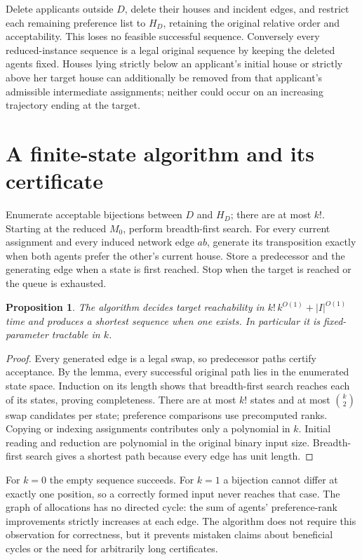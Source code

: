 \documentclass[11pt]{article}
\newtheorem{proposition}{Proposition}
\begin{document}
Delete applicants outside $D$, delete their houses and incident edges, and restrict each remaining preference list to $H_D$, retaining the original relative order and acceptability. This loses no feasible successful sequence. Conversely every reduced-instance sequence is a legal original sequence by keeping the deleted agents fixed. Houses lying strictly below an applicant's initial house or strictly above her target house can additionally be removed from that applicant's admissible intermediate assignments; neither could occur on an increasing trajectory ending at the target.

\section*{A finite-state algorithm and its certificate}
Enumerate acceptable bijections between $D$ and $H_D$; there are at most $k!$. Starting at the reduced $M_0$, perform breadth-first search. For every current assignment and every induced network edge $ab$, generate its transposition exactly when both agents prefer the other's current house. Store a predecessor and the generating edge when a state is first reached. Stop when the target is reached or the queue is exhausted.

\begin{proposition}
The algorithm decides target reachability in $k!\,k^{O(1)}+|I|^{O(1)}$ time and produces a shortest sequence when one exists. In particular it is fixed-parameter tractable in $k$.
\end{proposition}
\begin{proof}
Every generated edge is a legal swap, so predecessor paths certify acceptance. By the lemma, every successful original path lies in the enumerated state space. Induction on its length shows that breadth-first search reaches each of its states, proving completeness. There are at most $k!$ states and at most $\binom k2$ swap candidates per state; preference comparisons use precomputed ranks. Copying or indexing assignments contributes only a polynomial in $k$. Initial reading and reduction are polynomial in the original binary input size. Breadth-first search gives a shortest path because every edge has unit length.
\end{proof}

For $k=0$ the empty sequence succeeds. For $k=1$ a bijection cannot differ at exactly one position, so a correctly formed input never reaches that case. The graph of allocations has no directed cycle: the sum of agents' preference-rank improvements strictly increases at each edge. The algorithm does not require this observation for correctness, but it prevents mistaken claims about beneficial cycles or the need for arbitrarily long certificates.
\end{document}
